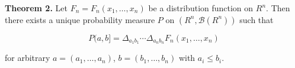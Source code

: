 \textbf{Theorem 2.} Let $F_n = F_n(x_1, \ldots, x_n)$ be a distribution function on $R^n$. Then there exists a unique probability measure $P$ on $(R^n, \mathcal{B}(R^n))$ such that

$$P(a, b] = \Delta_{a_1 b_1} \cdots \Delta_{a_n b_n} F_n(x_1, \ldots, x_n)$$

for arbitrary $a = (a_1, \ldots, a_n)$, $b = (b_1, \ldots, b_n)$ with $a_i \leq b_i$.
